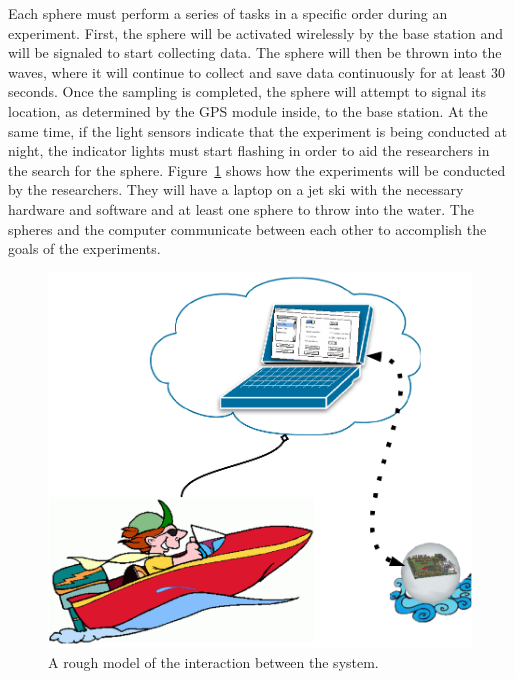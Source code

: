 Each sphere must perform a series of tasks in a specific order during an experiment.  First, the sphere will be activated wirelessly by the base station and will be signaled to start collecting data.  The sphere will then be thrown into the waves, where it will continue to collect and save data continuously for at least 30 seconds. Once the sampling is completed, the sphere will attempt to signal its location, as determined by the GPS module inside, to the base station.  At the same time, if the light sensors indicate that the experiment is being conducted at night, the indicator lights must start flashing in order to aid the researchers in the search for the sphere.  Figure~\ref{fig:GSV} shows how the experiments will be conducted by the researchers.  They will have a laptop on a jet ski with the necessary hardware and software and at least one sphere to throw into the water.  The spheres and the computer communicate between each other to accomplish the goals of the experiments.

\begin{figure}[H]
	\centering
	\includegraphics[scale=0.6]{img/GSV1}
	\caption{A rough model of the interaction between the system. \label{fig:GSV}}
\end{figure}

